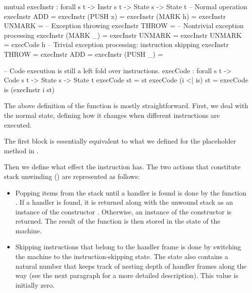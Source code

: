 \begin{codei}
  mutual
    execInstr : forall {s t} -> Instr s t -> State s -> State t
  	-- Normal operation
    execInstr ADD 				= \tick[ (x + y) \scons st ]
    execInstr (PUSH x)		\tick[ st ] 		= \tick[ x \scons st ]
    execInstr (MARK h)		\tick[ st ] 		= \tick[ h \sconsh st ]
    execInstr UNMARK			= \tick[ x \scons st ]
    -- Exception throwing  
    execInstr THROW			\tick[ st ] =  
    -- Nontrivial exception processing
    execInstr (MARK _)		\x[ n	 ,	r	] = \x[ suc n, r ]
    execInstr UNMARK		\x[ suc n ,	r	] = \x[ n	, r ]
    execInstr UNMARK		 = execCode h \tick[ st ]
    -- Trivial exception processing: instruction skipping
    execInstr THROW			\x[ n , r ] = \x[ n , r ]
    execInstr ADD			\x[ n , r ] = \x[ n , r ]
    execInstr (PUSH _)		\x[ n , r ] = \x[ n , r ]
\end{codei}
\begin{code}
    -- Code execution is still a left fold over instructions.
    execCode : forall {s t} -> Code s t -> State s -> State t
    execCode \nil st = st
    execCode (i <| is) st = execCode is (execInstr i st)
\end{code}

\noindent The above definition of the function  is mostly
straightforward.  First, we deal with the normal state, defining how it changes
when different instructions are executed.

The first block is essentially equivalent to what we defined for the
placeholder method in .

Then we define what effect the instruction  has. The two actions
that constitute stack unwinding () are
represented as follows:

\begin{itemize}
	\item Popping items from the stack until a handler is found is done by the
		function . If a handler is found, it is returned
		along with the unwound stack as an instance of the constructor
		. Otherwise, an instance of the constructor
		 is returned.
		The result of the function  is then stored in the
		state of the machine.

	\item Skipping instructions that belong to the handler frame is done by
		switching the machine to the instruction-skipping state. The state also
		contains a natural number that keeps track of nesting depth of handler
		frames along the way (see the next paragraph for a more detailed
		description). This value is initially zero.
\end{itemize}


